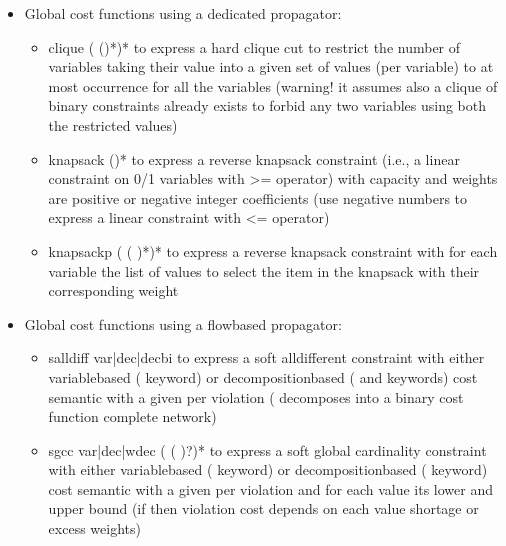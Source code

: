 \documentclass[letterpaper,10pt,openany,oneside,english]{sphinxmanual}
\begin{document}
\begin{fulllineitems}
\begin{itemize}
\item {} 
\sphinxAtStartPar
Global cost functions using a dedicated propagator:\begin{itemize}
\item {} 
\sphinxAtStartPar
clique  ( ()*)* to express a hard clique cut to restrict the number of variables taking their value into a given set of values (per variable) to at most  occurrence for all the variables (warning! it assumes also a clique of binary constraints already exists to forbid any two variables using both the restricted values)

\item {} 
\sphinxAtStartPar
knapsack  ()* to express a reverse knapsack constraint (i.e., a linear constraint on 0/1 variables with \textgreater{}= operator) with capacity and weights are positive or negative integer coefficients (use negative numbers to express a linear constraint with \textless{}= operator)

\item {} 
\sphinxAtStartPar
knapsackp  ( ( )*)* to express a reverse knapsack constraint with for each variable the list of values to select the item in the knapsack with their corresponding weight

\end{itemize}


\item {} 
\sphinxAtStartPar
Global cost functions using a flow\sphinxhyphen{}based propagator:\begin{itemize}
\item {} 
\sphinxAtStartPar
salldiff var|dec|decbi  to express a soft alldifferent constraint with either variable\sphinxhyphen{}based ( keyword) or decomposition\sphinxhyphen{}based ( and  keywords) cost semantic with a given  per violation ( decomposes into a binary cost function complete network)

\item {} 
\sphinxAtStartPar
sgcc var|dec|wdec   (   ( )?)* to express a soft global cardinality constraint with either variable\sphinxhyphen{}based ( keyword) or decomposition\sphinxhyphen{}based ( keyword) cost semantic with a given  per violation and for each value its lower and upper bound (if  then violation cost depends on each value shortage or excess weights)


\end{itemize}
\end{itemize}
\end{fulllineitems}
\end{document}
